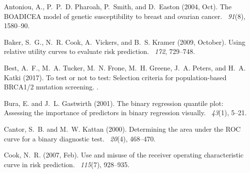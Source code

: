 \documentclass[11pt, letterpaper]{article}
\begin{document}
%
%

%
%


\begin{thebibliography}{}
	
	Antoniou, A., P.~P.~D. Pharoah, P.~Smith, and D.~Easton (2004, Oct).
	\newblock The {BOADICEA} model of genetic susceptibility to breast and ovarian
	cancer.
	~{\em 91\/}(8), 1580--90.
	
	Baker, S.~G., N.~R. Cook, A.~Vickers, and B.~S. Kramer (2009, October).
	\newblock Using relative utility curves to evaluate risk prediction.
	~{\em 172}, 729--748.
	
	Best, A.~F., M.~A. Tucker, M.~N. Frone, M.~H. Greene, J.~A. Peters, and H.~A.
	Katki (2017).
	\newblock To test or not to test: {S}election criteria for population-based
	{BRCA1/2} mutation screening.
	.
	
	Bura, E. and J.~L. Gastwirth (2001).
	\newblock The binary regression quantile plot: Assessing the importance of
	predictors in binary regression visually.
	~{\em 43\/}(1), 5--21.
	
	Cantor, S.~B. and M.~W. Kattan (2000).
	\newblock Determining the area under the {ROC} curve for a binary diagnostic
	test.
	~{\em 20\/}(4), 468--470.
	
	Cook, N.~R. (2007, Feb).
	\newblock Use and misuse of the receiver operating characteristic curve in risk
	prediction.
	~{\em 115\/}(7), 928--935.
	

\end{thebibliography}
\end{document}
